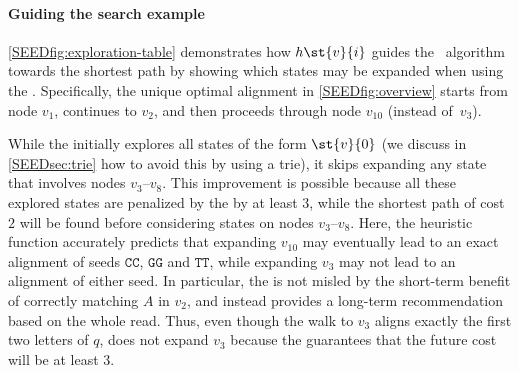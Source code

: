 

\paragraph{Guiding the search example}
%
\cref{SEEDfig:exploration-table} demonstrates how $h\st{v}{i}$ guides the
\A~algorithm towards the shortest path by showing which states may be
\colorbox{pink-highlight}{expanded} when using the \sh.
%
Specifically, the unique optimal alignment in \cref{SEEDfig:overview} starts from
node $v_{1}$, continues to $v_{2}$, and then proceeds through node $v_{10}$
(instead of~$v_{3}$).

While the \sh initially explores all states of the form $\st{v}{0}$ (we
discuss in \cref{SEEDsec:trie} how to avoid this by using a trie), it skips
expanding any state that involves nodes $v_{3}$--$v_{8}$. This improvement is
possible because all these explored states are penalized by the \sh by at
least $3$, while the shortest path of cost $2$ will be found before considering
states on nodes $v_{3}$--$v_{8}$.
%
Here, the heuristic function accurately predicts that expanding $v_{10}$ may
eventually lead to an exact alignment of seeds
\colorbox{light-yellow}{$\mathtt{CC}$}, \colorbox{light-violet}{$\mathtt{GG}$}
and \colorbox{light-green}{$\mathtt{TT}$}, while expanding $v_3$ may not lead to
an alignment of either seed.
%
In particular, the \sh is not misled by the short-term benefit of correctly
matching $A$ in $v_{2}$, and instead provides a long-term recommendation based
on the whole read. Thus, even though the walk to $v_{3}$ aligns exactly the
first two letters of $q$, \A does not expand $v_{3}$ because the \sh
guarantees that the future cost will be at least $3$.

